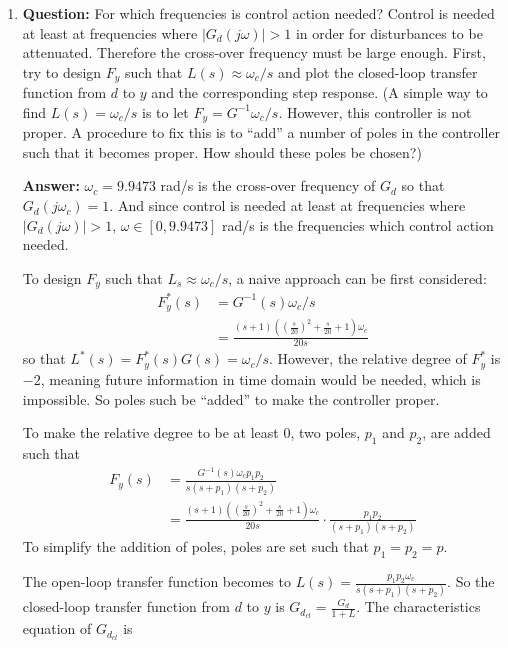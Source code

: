 \documentclass[11pt,a4paper]{article}
\begin{document}
\begin{enumerate}
	\item \textbf{Question:} For which frequencies is control action needed? Control is needed at least at frequencies where $\vert G_{d}(j\omega) \vert > 1$ in order for disturbances to be attenuated. Therefore the cross-over frequency must be large enough. First, try to design $F_{y}$ such that $L(s) \approx \omega_{c} / s$ and plot the closed-loop transfer function from $d$ to $y$ and the corresponding step response. (A simple way to find $L(s) = \omega_{c} / s$ is to let $F_{y} = G^{-1} \omega_{c} / s$. However, this controller is not proper. A procedure to fix this is to ``add'' a number of poles in the controller such that it becomes proper. How should these poles be chosen?)
	\par \textbf{Answer:} $\omega_{c} = 9.9473$ rad/s is the cross-over frequency of $G_{d}$ so that $G_{d}(j\omega_{c}) = 1$. And since control is needed at least at frequencies where $\vert G_{d}(j\omega) \vert > 1$, $\omega \in [0, 9.9473]$ rad/s is the frequencies which control action needed.
	\par To design $F_{y}$ such that $L_{s} \approx \omega_{c} / s$, a naive approach can be first considered:
	\begin{align*}
		F_{y}^{*}(s) &= G^{-1}(s) \omega_{c} / s \\
		&= \frac{(s+1)((\frac{s}{20})^{2}+\frac{s}{20}+1)\omega_{c}}{20s}
	\end{align*}
	so that $L^{*}(s) = F_{y}^{*}(s) G(s) = \omega_{c} / s$. However, the relative degree of $F_{y}^{*}$ is $-2$, meaning future information in time domain would be needed, which is impossible. So poles such be ``added'' to make the controller proper.
	\par To make the relative degree to be at least $0$, two poles, $p_{1}$ and $p_{2}$, are added such that
	\begin{align*}
		F_{y}(s) &= \frac{G^{-1}(s)\omega_{c}p_{1}p_{2}}{s(s+p_{1})(s+p_{2})} \\
		&= \frac{(s+1)((\frac{s}{20})^{2}+\frac{s}{20}+1)\omega_{c}}{20s} \cdot \frac{p_{1}p_{2}}{(s+p_{1})(s+p_{2})}
	\end{align*}
	To simplify the addition of poles, poles are set such that $p_{1}=p_{2}=p$.
	\par The open-loop transfer function becomes to $L(s) = \frac{p_{1}p_{2}\omega_{c}}{s(s+p_{1})(s+p_{2})}$. So the closed-loop transfer function from $d$ to $y$ is $G_{d_{cl}}=\frac{G_{d}}{1+L}$. The characteristics equation of $G_{d_{cl}}$ is

\end{enumerate}
\end{document}
